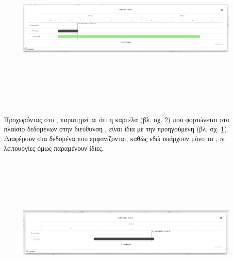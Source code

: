 \begin{figure}[!htb]
\includegraphics[width=\columnwidth, height=8cm]{images/userTasks.png}
\caption{}
\label{fig:userTasks}
\end{figure}

\subsubsection*{}
\pSpace Προχωρόντας στο , παρατηρείται ότι η καρτέλα (βλ. σχ. \ref{fig:userIssues}) που φορτώνεται στο πλαίσιο δεδομένων στην διεύθυνση , είναι ίδια με την προηγούμενη (βλ. σχ. \ref{fig:userTasks}). Διαφέρουν στα δεδομένα που εμφανίζονται, καθώς εδώ υπάρχουν μόνο τα , oι λειτουργίες όμως παραμένουν ίδιες.

\begin{figure}[!htb]
\includegraphics[width=\columnwidth, height=8cm]{images/userIssues.png}
\caption{}
\label{fig:userIssues}
\end{figure}

